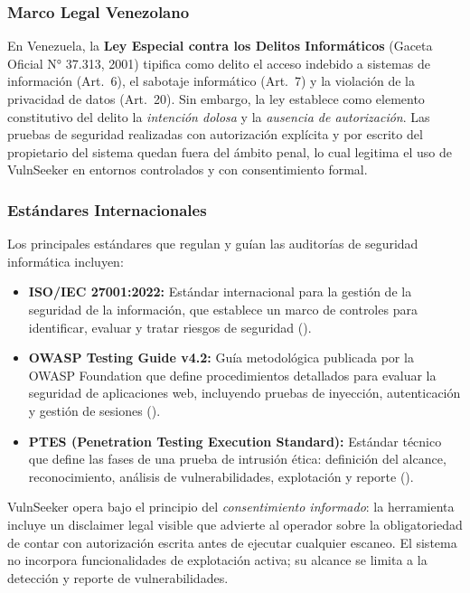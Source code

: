 \documentclass[12pt, a4paper]{article}
\begin{document}
\subsubsection{Marco Legal Venezolano}

En Venezuela, la \textbf{Ley Especial contra los Delitos Informáticos} (Gaceta
Oficial N° 37.313, 2001) tipifica como delito el acceso indebido a sistemas de
información (Art.~6), el sabotaje informático (Art.~7) y la violación de la
privacidad de datos (Art.~20). Sin embargo, la ley establece como elemento
constitutivo del delito la \textit{intención dolosa} y la \textit{ausencia de
autorización}. Las pruebas de seguridad realizadas con autorización explícita y
por escrito del propietario del sistema quedan fuera del ámbito penal, lo cual
legitima el uso de VulnSeeker en entornos controlados y con consentimiento
formal.

\subsubsection{Estándares Internacionales}

Los principales estándares que regulan y guían las auditorías de seguridad
informática incluyen:

\begin{itemize}
    \item \textbf{ISO/IEC 27001:2022:} Estándar internacional para la gestión
    de la seguridad de la información, que establece un marco de controles para
    identificar, evaluar y tratar riesgos de seguridad (\cite{iso27001}).

    \item \textbf{OWASP Testing Guide v4.2:} Guía metodológica publicada por la
    OWASP Foundation que define procedimientos detallados para evaluar la
    seguridad de aplicaciones web, incluyendo pruebas de inyección, autenticación
    y gestión de sesiones (\cite{owasptesting}).

    \item \textbf{PTES (Penetration Testing Execution Standard):} Estándar
    técnico que define las fases de una prueba de intrusión ética: definición del
    alcance, reconocimiento, análisis de vulnerabilidades, explotación y reporte
    (\cite{ptes}).
\end{itemize}

VulnSeeker opera bajo el principio del \textit{consentimiento informado}: la
herramienta incluye un disclaimer legal visible que advierte al operador sobre
la obligatoriedad de contar con autorización escrita antes de ejecutar cualquier
escaneo. El sistema no incorpora funcionalidades de explotación activa; su
alcance se limita a la detección y reporte de vulnerabilidades.
\end{document}
